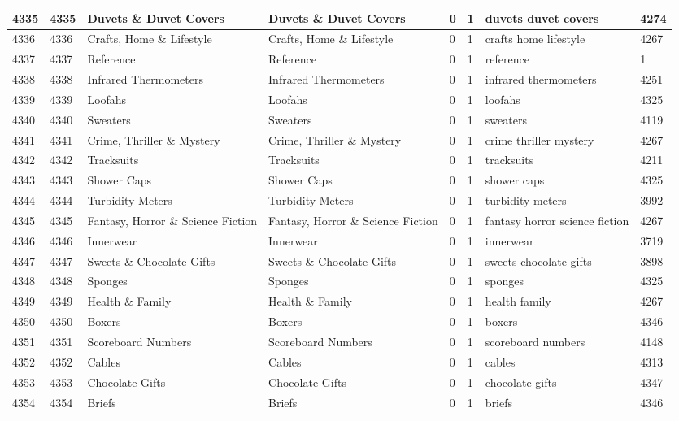\begin{longtable}{|l|l|l|l|l|l|l|l|}
4335 & 4335 & Duvets \& Duvet Covers & Duvets \& Duvet Covers & 0 & 1 & duvets duvet covers & 4274 \\ \hline 
4336 & 4336 & Crafts, Home \& Lifestyle & Crafts, Home \& Lifestyle & 0 & 1 & crafts home lifestyle & 4267 \\ \hline 
4337 & 4337 & Reference & Reference & 0 & 1 & reference & 1 \\ \hline 
4338 & 4338 & Infrared Thermometers & Infrared Thermometers & 0 & 1 & infrared thermometers & 4251 \\ \hline 
4339 & 4339 & Loofahs & Loofahs & 0 & 1 & loofahs & 4325 \\ \hline 
4340 & 4340 & Sweaters & Sweaters & 0 & 1 & sweaters & 4119 \\ \hline 
4341 & 4341 & Crime, Thriller \& Mystery & Crime, Thriller \& Mystery & 0 & 1 & crime thriller mystery & 4267 \\ \hline 
4342 & 4342 & Tracksuits & Tracksuits & 0 & 1 & tracksuits & 4211 \\ \hline 
4343 & 4343 & Shower Caps & Shower Caps & 0 & 1 & shower caps & 4325 \\ \hline 
4344 & 4344 & Turbidity Meters & Turbidity Meters & 0 & 1 & turbidity meters & 3992 \\ \hline 
4345 & 4345 & Fantasy, Horror \& Science Fiction & Fantasy, Horror \& Science Fiction & 0 & 1 & fantasy horror science fiction & 4267 \\ \hline 
4346 & 4346 & Innerwear & Innerwear & 0 & 1 & innerwear & 3719 \\ \hline 
4347 & 4347 & Sweets \& Chocolate Gifts & Sweets \& Chocolate Gifts & 0 & 1 & sweets chocolate gifts & 3898 \\ \hline 
4348 & 4348 & Sponges & Sponges & 0 & 1 & sponges & 4325 \\ \hline 
4349 & 4349 & Health \& Family & Health \& Family & 0 & 1 & health family & 4267 \\ \hline 
4350 & 4350 & Boxers & Boxers & 0 & 1 & boxers & 4346 \\ \hline 
4351 & 4351 & Scoreboard Numbers & Scoreboard Numbers & 0 & 1 & scoreboard numbers & 4148 \\ \hline 
4352 & 4352 & Cables & Cables & 0 & 1 & cables & 4313 \\ \hline 
4353 & 4353 & Chocolate Gifts & Chocolate Gifts & 0 & 1 & chocolate gifts & 4347 \\ \hline 
4354 & 4354 & Briefs & Briefs & 0 & 1 & briefs & 4346 \\ \hline 

\end{longtable}
